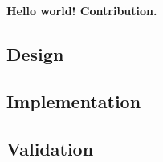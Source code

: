 \documentclass[../../main.tex]{subfiles}
\begin{document}
\textbf{Hello world! Contribution.}

\subsection{Design}

\newpage

\subsection{Implementation}

\newpage

\subsection{Validation}

\newpage
\end{document}

